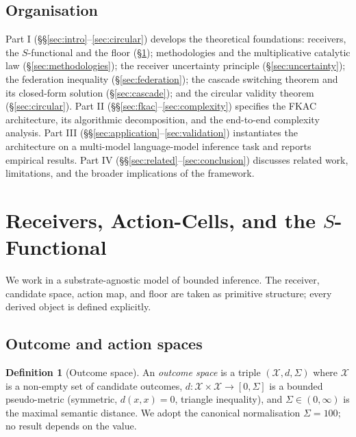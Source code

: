 \documentclass[11pt,twocolumn,a4paper]{article}
\theoremstyle{definition}
\newtheorem{definition}[theorem]{Definition}
\theoremstyle{remark}
\newcommand{\Cands}{\mathcal{X}}
\newcommand{\Sigmax}{\Sigma}
\newcommand{\Sscalar}{S}
\begin{document}
\subsection{Organisation}

Part I (\S\S\ref{sec:intro}--\ref{sec:circular}) develops the theoretical foundations: receivers, the $\Sscalar$-functional and the floor (\S\ref{sec:receivers}); methodologies and the multiplicative catalytic law (\S\ref{sec:methodologies}); the receiver uncertainty principle (\S\ref{sec:uncertainty}); the federation inequality (\S\ref{sec:federation}); the cascade switching theorem and its closed-form solution (\S\ref{sec:cascade}); and the circular validity theorem (\S\ref{sec:circular}). Part II (\S\S\ref{sec:fkac}--\ref{sec:complexity}) specifies the FKAC architecture, its algorithmic decomposition, and the end-to-end complexity analysis. Part III (\S\S\ref{sec:application}--\ref{sec:validation}) instantiates the architecture on a multi-model language-model inference task and reports empirical results. Part IV (\S\S\ref{sec:related}--\ref{sec:conclusion}) discusses related work, limitations, and the broader implications of the framework.


\section{Receivers, Action-Cells, and the $\Sscalar$-Functional}
\label{sec:receivers}

We work in a substrate-agnostic model of bounded inference. The receiver, candidate space, action map, and floor are taken as primitive structure; every derived object is defined explicitly.

\subsection{Outcome and action spaces}

\begin{definition}[Outcome space]
\label{def:outcome}
An \emph{outcome space} is a triple $(\Cands, d, \Sigmax)$ where $\Cands$ is a non-empty set of candidate outcomes, $d : \Cands \times \Cands \to [0, \Sigmax]$ is a bounded pseudo-metric (symmetric, $d(x,x) = 0$, triangle inequality), and $\Sigmax \in (0, \infty)$ is the maximal semantic distance. We adopt the canonical normalisation $\Sigmax = 100$; no result depends on the value.
\end{definition}
\end{document}

